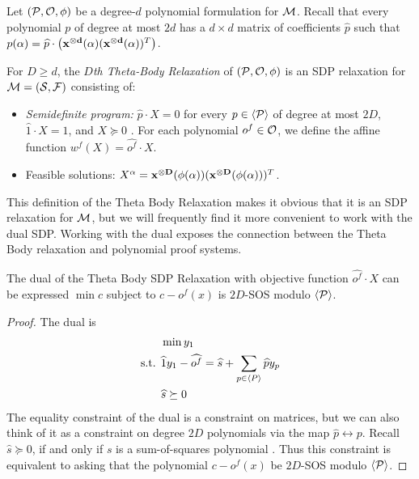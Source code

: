 Let $(\mathcal P, \mathcal O, \phi)$ be a degree-$d$ polynomial formulation for $\mathcal M$. Recall that every polynomial $p$ of degree at most $2d$ has a $d \times d$ matrix of coefficients $\widehat{p}$ such that $p(\alpha) = \widehat{p} \cdot \left( \mathbf{x^{\otimes d}}(\alpha)(\mathbf{x^{\otimes d}}(\alpha))^T\right)$.
\begin{definition}
For $D \geq d$, the \emph{$D$th Theta-Body Relaxation} of $(\mathcal P,\mathcal O,\phi)$ is an SDP relaxation for $\mathcal M = (\mathcal S, \mathcal F)$ consisting of:
\begin{itemize}
    \item \emph{Semidefinite program:} $\widehat{p} \cdot X = 0$ for every $p \in \langle \mathcal P \rangle$ of degree at most $2D$, $\widehat{1} \cdot X = 1$, and $X \succeq 0$ . For each polynomial $o^f \in \mathcal O$, we define the affine function $w^f(X) = \widehat{o^f} \cdot X$.
\item Feasible solutions: $X^\alpha = \mathbf{x^{\otimes D}}(\phi(\alpha))(\mathbf{x^{\otimes D}}(\phi(\alpha)))^T$.
\end{itemize}
\end{definition}
This definition of the Theta Body Relaxation makes it obvious that it is an SDP relaxation for $\mathcal M$, but we will frequently find it more convenient to work with the dual SDP. Working with the dual exposes the connection between the Theta Body relaxation and polynomial proof systems.
\begin{lemma}
The dual of the Theta Body SDP Relaxation with objective function $\widehat{o^f} \cdot X$ can be expressed $\min c$ subject to $c - o^f(x)$ is $2D$-SOS modulo $\langle \mathcal P \rangle$.
\end{lemma}
\begin{proof}
The dual is
\begin{align*}
&\min y_1 \\
\text{s.t. }&\widehat{1}y_1 - \widehat{o^f} = \widehat{s} + \sum_{p \in \langle P \rangle} \widehat{p}y_p \\
&\widehat{s} \succeq 0
\end{align*}
    The equality constraint of the dual is a constraint on matrices, but we can also think of it as a constraint on degree $2D$ polynomials via the map $\widehat{p} \leftrightarrow p$. Recall $\widehat{s} \succeq 0$, if and only if $s$ is a sum-of-squares polynomial . Thus this constraint is equivalent to asking that the polynomial $c - o^f(x)$ be $2D$-SOS modulo $\langle \mathcal P \rangle$.
\end{proof}

